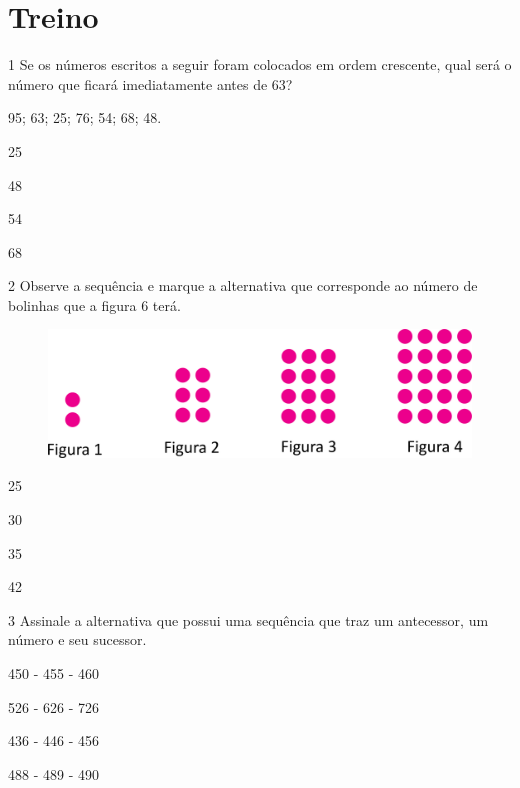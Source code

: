 \section*{Treino}

\num{1} Se os números escritos a seguir foram colocados em ordem crescente, qual
será o número que ficará imediatamente antes de 63?

\begin{myquote}
95; 63; 25; 76; 54; 68; 48.
\end{myquote}

\begin{escolha}

\item
  25
\item
  48
\item
  54
\item
  68
\end{escolha}


\num{2} Observe a sequência e marque a alternativa que corresponde ao número de bolinhas que a figura 6 terá.

\begin{figure}[htpb!]
\includegraphics[width=\textwidth]{./media/image37.png}
\end{figure}

\begin{escolha}
\item
  25
\item
  30
\item
  35
\item
  42
\end{escolha}


\num{3} Assinale a alternativa que possui uma sequência que traz um antecessor, um número e seu sucessor.

\begin{escolha}
\item 450 - 455 - 460

\item 526 - 626 - 726

\item 436 - 446 - 456

\item 488 - 489 - 490
\end{escolha}

